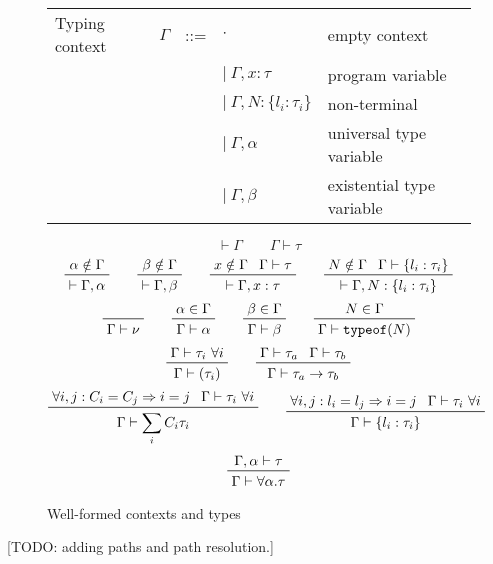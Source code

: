 \documentclass[letterpaper]{article}
\newcommand{\todo}[1]{{\color{red}[TODO: #1]}}
\begin{document}
\begin{figure}
  \begin{tabular}{l c l l l}
    Typing context            & $\Gamma$ & ::= & $ \cdot $                       & empty context \\
                              &          &     & $|\ \Gamma, x: \tau $           & program variable \\
                              &          &     & $|\ \Gamma, N: \{l_i:\tau_i\} $ & non-terminal \\
                              &          &     & $|\ \Gamma, \alpha $            & universal type variable \\
                              &          &     & $|\ \Gamma, \beta  $            & existential type variable\\
  \end{tabular}
  $$ $$
  $$ \boxed{\vdash\Gamma} \qquad \boxed{\Gamma\vdash\tau} $$
  $$ \prftree{\prfassumption{\alpha\notin\Gamma}}
             {\vdash\Gamma, \alpha}\qquad
     \prftree{\prfassumption{\beta\notin\Gamma}}
             {\vdash\Gamma, \beta}\qquad
     \prftree{\prfassumption{x\notin\Gamma}}{\prfassumption{\Gamma\vdash\tau}}
             {\vdash\Gamma, x:\tau}\qquad
     \prftree{\prfassumption{N\notin\Gamma}}{\prfassumption{\Gamma\vdash\{l_i:\tau_i\}}}
             {\vdash\Gamma, N:\{l_i:\tau_i\}} $$
  $$ \prfaxiom{\Gamma\vdash\nu}\qquad
     \prftree{\prfassumption{\alpha\in\Gamma}}
             {\Gamma\vdash\alpha}\qquad
     \prftree{\prfassumption{\beta\in\Gamma}}
             {\Gamma\vdash\beta}\qquad
     \prftree{\prfassumption{N\in\Gamma}}
             {\Gamma\vdash\texttt{typeof}(N)} $$
  $$ \prftree{\prfassumption{\Gamma\vdash\tau_i\ \forall i}}
             {\Gamma\vdash(\tau_i)}\qquad
     \prftree{\prfassumption{\Gamma\vdash\tau_a}}{\prfassumption{\Gamma\vdash\tau_b}}
             {\Gamma\vdash\tau_a\rightarrow\tau_b} $$
  $$ \prftree{\prfassumption{\forall i,j:C_i=C_j\Rightarrow i=j}}
             {\prfassumption{\Gamma\vdash\tau_i\ \forall i}}
             {\Gamma\vdash\sum_i C_i\tau_i}\qquad
     \prftree{\prfassumption{\forall i,j:l_i=l_j\Rightarrow i=j}}
             {\prfassumption{\Gamma\vdash\tau_i\ \forall i}}
             {\Gamma\vdash\{l_i:\tau_i\}} $$
  $$ \prftree{\prfassumption{\Gamma,\alpha\vdash\tau}}
             {\Gamma\vdash\forall\alpha.\tau} $$
  \caption{Well-formed contexts and types}
  \label{f:ctxt}
\end{figure}

\todo{adding paths and path resolution.}
\end{document}
